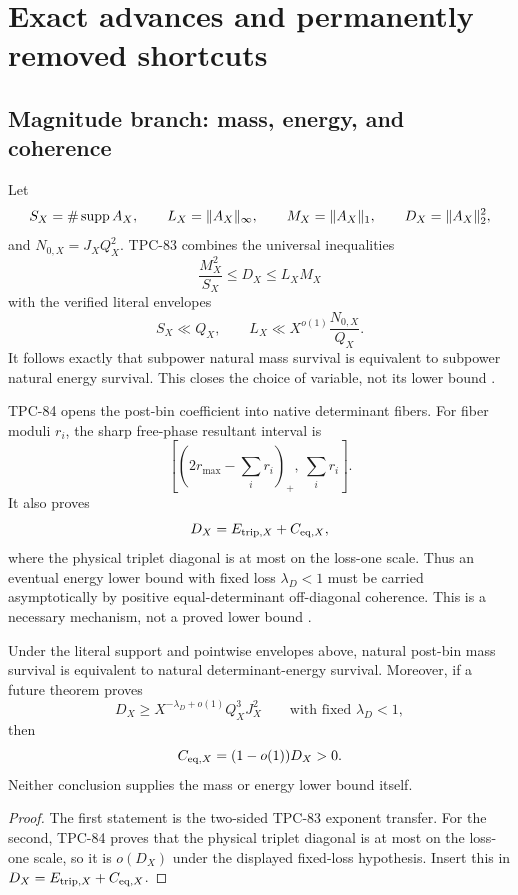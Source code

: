 \section{Exact advances and permanently removed shortcuts}
\label{sec:exact-advances}

\subsection{Magnitude branch: mass, energy, and coherence}

Let
\[
 S_X=\#\operatorname{supp} A_X,\qquad
 L_X=\|A_X\|_\infty,\qquad
 M_X=\|A_X\|_1,\qquad
 D_X=\|A_X\|_2^2,
\]
and \(N_{0,X}=J_XQ_X^2\).  TPC-83 combines the universal inequalities
\[
 \frac{M_X^2}{S_X}\le D_X\le L_XM_X
\]
with the verified literal envelopes
\[
 S_X\ll Q_X,\qquad
 L_X\ll X^{o(1)}\frac{N_{0,X}}{Q_X}.
\]
It follows exactly that subpower natural mass survival is equivalent
to subpower natural energy survival.  This closes the choice of
variable, not its lower bound \citep{WangTPC83}.

TPC-84 opens the post-bin coefficient into native determinant fibers.
For fiber moduli \(r_i\), the sharp free-phase resultant interval is
\[
 \left[(2r_{\max}-\sum_i r_i)_+,\ \sum_i r_i\right].
\]
It also proves
\[
 D_X=E_{{\rm trip},X}+C_{{\rm eq},X},
\]
where the physical triplet diagonal is at most on the loss-one scale.
Thus an eventual energy lower bound with fixed loss
\(\lambda_D<1\) must be carried asymptotically by positive
equal-determinant off-diagonal coherence.  This is a necessary
mechanism, not a proved lower bound \citep{WangTPC84}.

\begin{proposition}
\label{prop:magnitude-output}
Under the literal support and pointwise envelopes above, natural
post-bin mass survival is equivalent to natural determinant-energy
survival.  Moreover, if a future theorem proves
\[
 D_X\ge X^{-\lambda_D+o(1)}Q_X^3J_X^2
 \qquad\text{with fixed }\lambda_D<1,
\]
then
\[
 C_{{\rm eq},X}=(1-o(1))D_X>0.
\]
Neither conclusion supplies the mass or energy lower bound itself.
\end{proposition}

\begin{proof}
The first statement is the two-sided TPC-83 exponent transfer.  For
the second, TPC-84 proves that the physical triplet diagonal is at
most on the loss-one scale, so it is \(o(D_X)\) under the displayed
fixed-loss hypothesis.  Insert this in
\(D_X=E_{{\rm trip},X}+C_{{\rm eq},X}\).
\end{proof}

